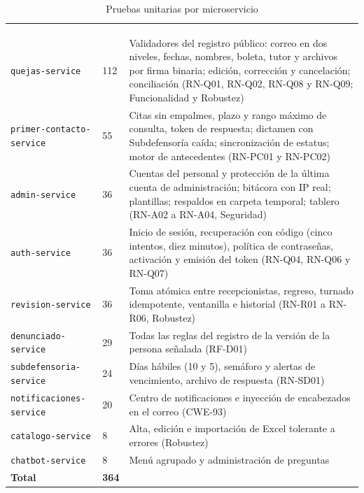 	\small
	\renewcommand{\arraystretch}{1.2}
	\setlength{\tabcolsep}{4pt}
	\begin{longtable}{|p{3.4cm}|L{1.3cm}|L{9.8cm}|}
		\hiderowcolors\caption{Pruebas unitarias por microservicio}
		\label{tab:pruebas_unitarias} \\ \showrowcolors
		\hline
		 &  &  \\
		\hline
		\endfirsthead
		\hline
		 &  &  \\
		\hline
		\endhead
		\texttt{quejas-service} & 112 & Validadores del registro público: correo en dos niveles, fechas,
		nombres, boleta, tutor y archivos por firma binaria; edición, corrección y cancelación; conciliación
		(RN-Q01, RN-Q02, RN-Q08 y RN-Q09; Funcionalidad y Robustez) \\ \hline
		\texttt{primer-contacto-service} & 55 & Citas sin empalmes, plazo y rango máximo de consulta,
		token de respuesta; dictamen con Subdefensoría caída; sincronización de estatus; motor de
		antecedentes (RN-PC01 y RN-PC02) \\ \hline
		\texttt{admin-service} & 36 & Cuentas del personal y protección de la última cuenta de
		administración; bitácora con IP real; plantillas; respaldos en carpeta temporal; tablero (RN-A02 a
		RN-A04, Seguridad) \\ \hline
		\texttt{auth-service} & 36 & Inicio de sesión, recuperación con código (cinco intentos, diez
		minutos), política de contraseñas, activación y emisión del token (RN-Q04, RN-Q06 y RN-Q07) \\ \hline
		\texttt{revision-service} & 36 & Toma atómica entre recepcionistas, regreso, turnado idempotente,
		ventanilla e historial (RN-R01 a RN-R06, Robustez) \\ \hline
		\texttt{denunciado-service} & 29 & Todas las reglas del registro de la versión de la persona
		señalada (RF-D01) \\ \hline
		\texttt{subdefensoria-service} & 24 & Días hábiles (10 y 5), semáforo y alertas de vencimiento,
		archivo de respuesta (RN-SD01) \\ \hline
		\texttt{notificaciones-service} & 20 & Centro de notificaciones e inyección de encabezados en el
		correo (CWE-93) \\ \hline
		\texttt{catalogo-service} & 8 & Alta, edición e importación de Excel tolerante a errores
		(Robustez) \\ \hline
		\texttt{chatbot-service} & 8 & Menú agrupado y administración de preguntas \\ \hline
		\textbf{Total} & \textbf{364} & \\ \hline
	\end{longtable}
	\normalsize

